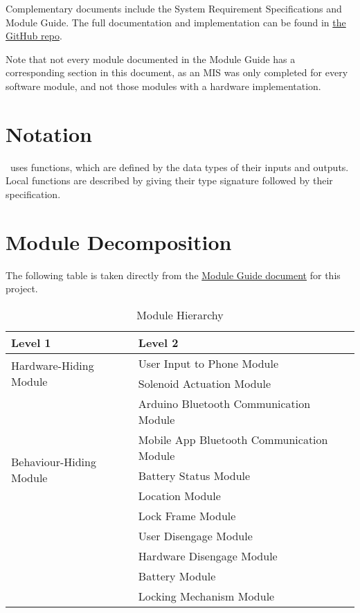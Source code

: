 \documentclass[12pt, titlepage]{article}
\begin{document}

Complementary documents include the System Requirement Specifications
and Module Guide.  The full documentation and implementation can be
found in \href{https://github.com/NevoAbigail/Capstone}{the GitHub repo}. %

Note that not every module documented in the Module Guide has a corresponding section in this document, as an MIS was only completed for every software module, and not those modules with a hardware implementation. 

\section{Notation}

\progname \ uses functions, which
are defined by the data types of their inputs and outputs. Local functions are
described by giving their type signature followed by their specification.

\section{Module Decomposition}

The following table is taken directly from the \href{https://github.com/NevoAbigail/Capstone/blob/main/docs/Design/SoftArchitecture/MG.pdf}{Module Guide document} for this project.

\begin{table}[h!]
\centering
\begin{tabular}{p{} p{}}
\toprule
\textbf{Level 1} & \textbf{Level 2}\\
\midrule

\multirow{2}{0.3\textwidth}{Hardware-Hiding Module} & User Input to Phone Module \\
& Solenoid Actuation Module \\
\midrule

\multirow{6}{0.3\textwidth}{Behaviour-Hiding Module} %
& Arduino Bluetooth Communication Module\\
& Mobile App Bluetooth Communication Module\\
& Battery Status Module \\
& Location Module  \\
& Lock Frame Module \\
\midrule

\multirow{5}{0.3\textwidth}{Software Decision Module} & User Disengage Module \\
& Hardware Disengage Module \\
& Battery Module \\
& Locking Mechanism Module \\
\bottomrule

\end{tabular}
\caption{Module Hierarchy}
\label{TblMH}
\end{table}
\end{document}
